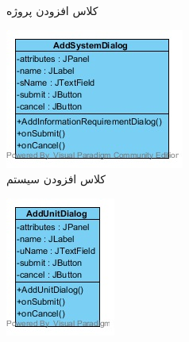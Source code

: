 \begin{figure}[H]
\begin{subfigure}[b]{0.2\textwidth}
		\caption{کلاس افزودن پروژه}
	\end{subfigure}
	\begin{subfigure}[b]{0.2\textwidth}
		\includegraphics[width=\textwidth]{img/class-design/ui/AddSystemDialog.jpg}
		\caption{کلاس افزودن سیستم }
	\end{subfigure}
	\begin{subfigure}[b]{0.2\textwidth}
		\includegraphics[width=\textwidth]{img/class-design/ui/AddUnitDialog.jpg}

\end{subfigure}
\end{figure}
